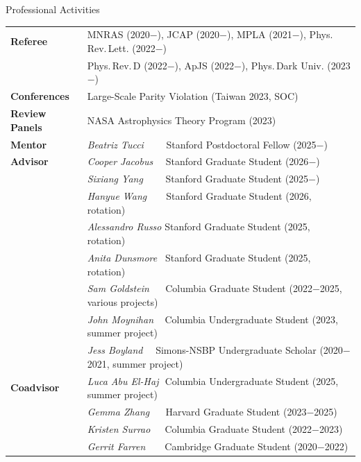 \documentclass{resume} %
\begin{document}
\pagebreak
\begin{rSection}{Professional Activities}
\begin{tabular}{ @{} >{\bfseries}l @{\hspace{6ex}} l }
Referee & MNRAS (2020$-$), JCAP (2020$-$), MPLA (2021$-$), Phys.\,Rev.\,Lett. (2022$-$)\\
& Phys.\,Rev.\,D (2022$-$), ApJS (2022$-$), Phys.\,Dark Univ. (2023$-$)\smallskip\\
Conferences & Large-Scale Parity Violation (Taiwan 2023, SOC)\smallskip\\
Review Panels & NASA Astrophysics Theory Program (2023)\smallskip\\
Mentor & \textit{Beatriz Tucci}\,\,\,\,\,\,\,\,\,\,\,\,\,\,Stanford Postdoctoral Fellow (2025$-$)\smallskip\\
Advisor 
& \textit{Cooper Jacobus}\,\,\,\,\,\,\,\,Stanford Graduate Student (2026$-$)\\
& \textit{Sixiang Yang}\,\,\,\,\,\,\,\,\,\,\,\,\,\,Stanford Graduate Student (2025$-$)\\
& \textit{Hanyue Wang}\,\,\,\,\,\,\,\,\,\,\,\,Stanford Graduate Student (2026, rotation)\\
& \textit{Alessandro Russo}\,\,Stanford Graduate Student (2025, rotation)\\
& \textit{Anita Dunsmore}\,\,\,\,\,Stanford Graduate Student (2025, rotation)\\
& \textit{Sam Goldstein}\,\,\,\,\,\,\,\, Columbia Graduate Student (2022$-$2025, various projects)\\
& \textit{John Moynihan}\,\,\,\,\, Columbia Undergraduate Student (2023, summer project)\\
& \textit{Jess Boyland} \quad\,\,\,\, Simons-NSBP Undergraduate Scholar (2020$-$2021, summer project)\smallskip\\
Coadvisor  
& \textit{Luca Abu El-Haj}\,\, Columbia Undergraduate Student (2025,  summer project)\\
& \textit{Gemma Zhang}\,\,\,\,\,\,\,\, Harvard Graduate Student (2023$-$2025)\\
& \textit{Kristen Surrao}\,\,\,\,\,\,\, Columbia Graduate Student (2022$-$2023)\\
& \textit{Gerrit Farren}\,\,\,\,\,\,\,\,\,\, Cambridge Graduate Student (2020$-$2022)\\
\end{tabular}
\end{rSection}
\end{document}
